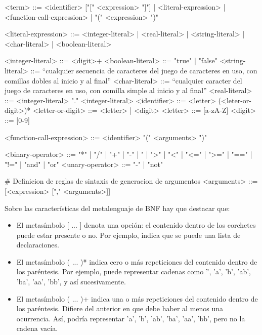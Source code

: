 \begin{BNFCode}
<term> ::= <identifier> ["[" <expression> "]"]
	| <literal-expression>
	| <function-call-expression>
	| "(" <expression> ")"
	
<literal-expression> ::= <integer-literal>
	| <real-literal>
	| <string-literal>
	| <char-literal>
	| <boolean-literal>
	
<integer-literal> ::= <digit>+
<boolean-literal> ::= "true" | "false"
<string-literal> ::= ``cualquier secuencia de caracteres del juego de caracteres en uso, con comillas dobles al inicio y al final''
<char-literal> ::= ``cualquier caracter del juego de caracteres en uso, con comilla simple al inicio y al final''
<real-literal> ::= <integer-literal> "." <integer-literal>
<identifier> ::= <letter> (<leter-or-digit>)*
<letter-or-digit> ::= <letter> | <digit>
<letter> ::= [a-zA-Z]
<digit> ::= [0-9]

<function-call-expression> ::= <identifier> "(" <arguments> ")"

<binary-operator> ::= "*" | "/" | "+" | "-" | "%
 	| ">" | "<" | "<=" | ">=" | "==" | "!="
	| "and" | "or"
<unary-operator> ::= "-" | "not"

# Definicion de reglas de sintaxis de generacion de argumentos
<arguments> ::= [<expression> ["," <arguments>]]
\end{BNFCode}

\noindent
Sobre las características del metalenguaje de BNF hay que destacar que:
\begin{itemize}
    \item El metasímbolo [ ... ] denota una opción: el contenido dentro de los corchetes puede estar presente o no. Por ejemplo, \code{[<declarations>]} indica que se puede una lista de declaraciones.
    \item El metasímbolo ( ... )* indica cero o más repeticiones del contenido dentro de los paréntesis. Por ejemplo,  puede representar cadenas como '', 'a', 'b', 'ab', 'ba', 'aa', 'bb', y así sucesivamente.
    \item El metasímbolo ( ... )+ indica una o más repeticiones del contenido dentro de los paréntesis. Difiere del anterior en que debe haber al menos una ocurrencia. Así,  podría representar 'a', 'b', 'ab', 'ba', 'aa', 'bb', pero no la cadena vacía.
\end{itemize}

